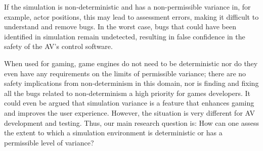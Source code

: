 \documentclass[letterpaper, 10 pt, journal, twoside]{IEEEtran}
\begin{document}
%
%

If the simulation is non-deterministic and has a non-permissible variance in, for example, actor positions, this may lead to assessment errors, making it difficult to understand and remove bugs. In the worst case, bugs that could have been identified in simulation remain undetected, resulting in false confidence in the safety of the AV's control software. 
%


When used for gaming, game engines do not need to be deterministic nor do they even have any requirements on the limits of permissible variance; there are no safety implications from non-determinism in this domain, nor is finding and fixing all the bugs related to non-determinism a high priority for games developers. It could even be argued that simulation variance is a feature that enhances gaming and improves the user experience. However, the situation is very different for AV development and testing. Thus, our main research question is:
%
%
How can one assess the extent to which a simulation environment is deterministic or has a permissible level of variance?
\end{document}

